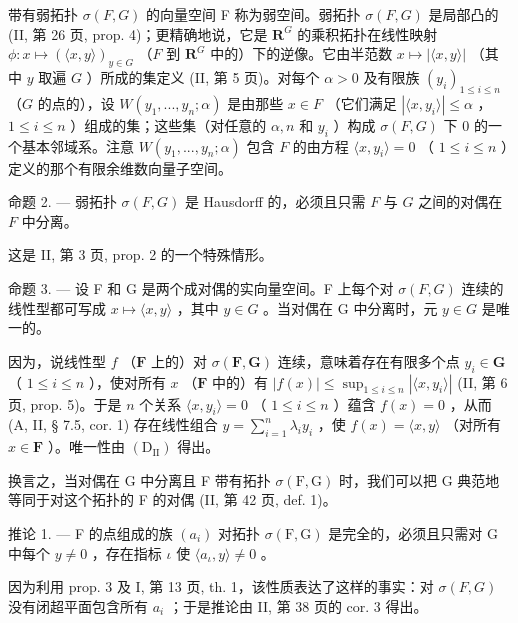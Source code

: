带有弱拓扑 \(\sigma(F, G)\) 的向量空间 F 称为弱空间。弱拓扑 \(\sigma(F, G)\) 是局部凸的 (II, 第 26 页, prop. 4)；更精确地说，它是 \(\mathbf{R}^G\) 的乘积拓扑在线性映射 \(\phi: x \mapsto (\langle x, y \rangle)_{y \in G}\) （\(F\) 到 \(\mathbf{R}^G\) 中的）下的逆像。它由半范数 \(x \mapsto |\langle x, y \rangle|\) （其中 \(y\) 取遍 \(G\) ）所成的集定义 (II, 第 5 页)。对每个 \(\alpha > 0\) 及有限族 \((y_i)_{1 \leq i \leq n}\) （\(G\) 的点的），设 \(W(y_1, ..., y_n; \alpha)\) 是由那些 \(x \in F\) （它们满足 \(|\langle x, y_i \rangle| \leqslant \alpha\) ，\(1 \leq i \leq n\) ）组成的集；这些集（对任意的 \(\alpha, n\) 和 \(y_i\) ）构成 \(\sigma(F, G)\) 下 0 的一个基本邻域系。注意 \(W(y_1, ..., y_n; \alpha)\) 包含 \(F\) 的由方程 \(\langle x, y_i \rangle = 0\) （ \(1 \leq i \leq n\) ）定义的那个有限余维数向量子空间。

命题 2. --- 弱拓扑 \(\sigma(F, G)\) 是 Hausdorff 的，必须且只需 \(F\) 与 \(G\) 之间的对偶在 \(F\) 中分离。

这是 II, 第 3 页, prop. 2 的一个特殊情形。

命题 3. --- 设 F 和 G 是两个成对偶的实向量空间。F 上每个对 \(\sigma(F, G)\) 连续的线性型都可写成 \(x \mapsto \langle x, y \rangle\) ，其中 \(y \in G\) 。当对偶在 G 中分离时，元 \(y \in G\) 是唯一的。

因为，说线性型 \(f\) （\(\mathbf{F}\) 上的）对 \(\sigma(\mathbf{F}, \mathbf{G})\) 连续，意味着存在有限多个点 \(y_i \in \mathbf{G}\) （ \(1 \leqslant i \leqslant n\) ），使对所有 \(x\) （\(\mathbf{F}\) 中的）有 \(|f(x)| \leqslant \sup_{1 \leqslant i \leqslant n} |\langle x, y_i \rangle|\) (II, 第 6 页, prop. 5)。于是 \(n\) 个关系 \(\langle x, y_i \rangle = 0\) （ \(1 \leqslant i \leqslant n\) ）蕴含 \(f(x) = 0\) ，从而 (A, II, § 7.5, cor. 1) 存在线性组合 \(y = \sum_{i=1}^{n} \lambda_i y_i\) ，使 \(f(x) = \langle x, y \rangle\) （对所有 \(x \in \mathbf{F}\) ）。唯一性由 \((\mathrm{D}_{\mathrm{II}})\) 得出。

换言之，当对偶在 G 中分离且 F 带有拓扑 \(\sigma(\mathrm{F}, \mathrm{G})\) 时，我们可以把 G 典范地等同于对这个拓扑的 F 的对偶 (II, 第 42 页, def. 1)。

推论 1. --- F 的点组成的族 \((a_i)\) 对拓扑 \(\sigma(\mathrm{F},\mathrm{G})\) 是完全的，必须且只需对 G 中每个 \(y \neq 0\) ，存在指标 \(\iota\) 使 \(\langle a_{\iota}, y \rangle \neq 0\) 。

因为利用 prop. 3 及 I, 第 13 页, th. 1，该性质表达了这样的事实：对 \(\sigma(F, G)\) 没有闭超平面包含所有 \(a_{i}\) ；于是推论由 II, 第 38 页的 cor. 3 得出。

